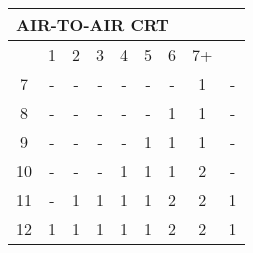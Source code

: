 

{\ttfamily
\begin{tabular}{|c|c|c|c|c|c|c|c|c|}
  \multicolumn{9}{l}{AIR-TO-AIR CRT} \\\hline
    & 1 & 2 & 3 & 4 & 5 & 6 & 7+ &  \\\hline
  7 & - & - & - & - & - & - & 1 & - \\
  8 & - & - & - & - & - & 1 & 1 & - \\
  9 & - & - & - & - & 1 & 1 & 1 & - \\
  10 & - & - & - & 1 & 1 & 1 & 2 & - \\
  \cline{7-8}
  11 & - & 1 & 1 & 1 & 1 & 2 & 2 & 1 \\
  \cline{5-6}
  12 & 1 & 1 & 1 & 1 & 1 & 2 & 2 & 1 \\\hline
\end{tabular} 
}


